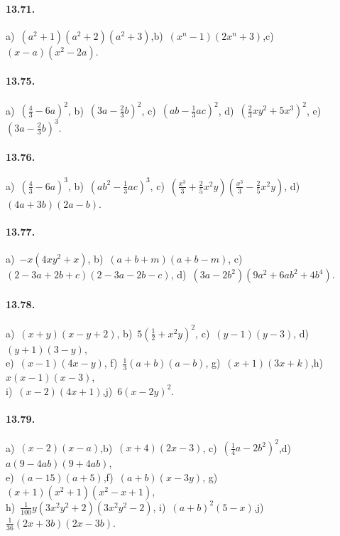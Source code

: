 \paragraph{13.71.} a)~$(a^{2}+1)(a^{2}+2)(a^{2}+3)$,\quad b)~$(x^{n}-1)(2x^{n}+3)$,\quad c)~$(x-a)\left(x^{2}-2a\right)$.

\paragraph{13.75.} a)~$\left(\frac{4}{3}-6a\right)^{2}$,\quad
b)~$\left(3a-\frac{2}{3}b\right)^{2}$,\quad
c)~$\left(ab-\frac{1}{3}ac\right)^{2}$,\quad
d)~$\left(\frac{2}{3}xy^{2}+5x^{3}\right)^{2}$,\quad
e)~$\left(3a-\frac{2}{3}b\right)^{3}$.

\paragraph{13.76.} a)~$\left(\frac{4}{3}-6a\right)^{3}$,\quad
b)~$\left(ab^{2}-\frac{1}{3}ac\right)^{3}$,\quad
c)~$\left(\frac{x^{3}}{3}+\frac{2}{5}x^{2}y\right)\left(\frac{x^{3}}{3}-\frac{2}{5}x^{2}y\right)$,\quad
d)~$(4a+3b)(2a-b)$.

\paragraph{13.77.} a)~$-x\left(4xy^{2}+x\right)$,\quad
b)~$(a+b+m)(a+b-m)$,\quad
c)~$(2-3a+2b+c)(2-3a-2b-c)$,\quad
d)~$\left(3a-2b^{2}\right)\left(9a^{2}+6ab^{2}+4b^{4}\right)$.

\paragraph{13.78.} a)~$(x+y)\left(x-y+2\right)$,\quad
b)~$5\left(\frac{1}{2}+x^{2}y\right)^{2}$,\quad
c)~$(y-1)\left(y-3\right)$,\quad
d)~$(y+1)\left(3-y\right)$,\protect\\
e)~$(x-1)\left(4x-y\right)$,\quad
f)~$\frac{1}{3}(a+b)\left(a-b\right)$,\quad
g)~$(x+1)\left(3x+k\right)$,\quad h)~$x(x-1)\left(x-3\right)$,\protect\\
i)~$(x-2)\left(4x+1\right)$,\quad j)~$6\left(x-2y\right)^{2}$.

\paragraph{13.79.} a)~$(x-2)\left(x-a\right)$,\quad b)~$(x+4)\left(2x-3\right)$,\quad
c)~$\left(\frac{1}{4}a-2b^{2}\right)^{2}$,\quad d)~$a(9-4{ab})(9+4{ab})$,\quad \protect\\
e)~$(a-15)(a+5)$,\quad f)~$(a+b)(x-3y)$,\quad
g)~$(x+1)\left(x^{2}+1\right)\left(x^{2}-x+1\right)$,\protect\\
h)~$\frac{1}{100}y\left(3x^{2}y^{2}+2\right)\left(3x^{2}y^{2}-2\right)$,\quad
i)~$(a+b)^{2}\left(5-x\right)$,\quad j)~$\frac{1}{36}(2x+3b)\left(2x-3b\right)$.


